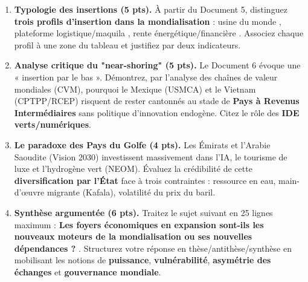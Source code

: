 \documentclass[11pt]{article}
\begin{document}
\begin{exercice}
\begin{enumerate}
\item \textbf{Typologie des insertions (5 pts).} À partir du Document 5, distinguez \textbf{trois profils d'insertion dans la mondialisation} : \og usine du monde \fg, \og plateforme logistique/maquila \fg, \og rente énergétique/financière \fg. Associez chaque profil à une zone du tableau et justifiez par deux indicateurs.
\item \textbf{Analyse critique du "near-shoring" (5 pts).} Le Document 6 évoque une « insertion par le bas ». Démontrez, par l'analyse des chaînes de valeur mondiales (CVM), pourquoi le Mexique (USMCA) et le Vietnam (CPTPP/RCEP) risquent de rester cantonnés au stade de \textbf{Pays à Revenus Intermédiaires} sans politique d'innovation endogène. Citez le rôle des \textbf{IDE verts/numériques}.
\item \textbf{Le paradoxe des Pays du Golfe (4 pts).} Les Émirats et l'Arabie Saoudite (Vision 2030) investissent massivement dans l'IA, le tourisme de luxe et l'hydrogène vert (NEOM). Évaluez la crédibilité de cette \textbf{diversification par l'État} face à trois contraintes : ressource en eau, main-d'œuvre migrante (Kafala), volatilité du prix du baril.
\item \textbf{Synthèse argumentée (6 pts).} Traitez le sujet suivant en 25 lignes maximum : \og \textbf{Les foyers économiques en expansion sont-ils les nouveaux moteurs de la mondialisation ou ses nouvelles dépendances ?} \fg. Structurez votre réponse en thèse/antithèse/synthèse en mobilisant les notions de \textbf{puissance}, \textbf{vulnérabilité}, \textbf{asymétrie des échanges} et \textbf{gouvernance mondiale}.
\end{enumerate}
\end{exercice}
\end{document}

